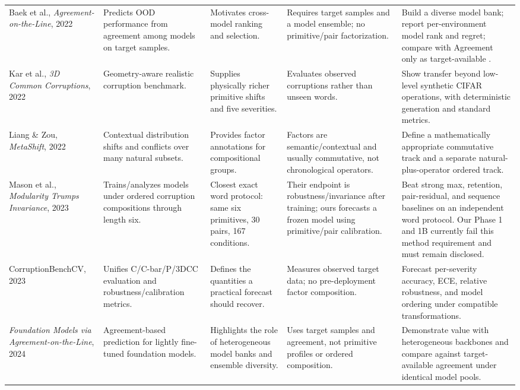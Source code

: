 \documentclass[11pt,a4paper]{article}
\newcommand{\Rthree}{\mathrm{R3}}
\begin{document}
\begin{landscape}
\begin{longtable}{P{3.1cm}P{3.4cm}P{4.4cm}P{4.4cm}P{5.0cm}}
Baek et al., \emph{Agreement-on-the-Line}, 2022 \cite{baek2022}
& Predicts OOD performance from agreement among models on target samples.
& Motivates cross-model ranking and selection.
& Requires target samples and a model ensemble; no primitive/pair factorization.
& Build a diverse model bank; report per-environment model rank and regret; compare with Agreement only as target-available \Rthree{}. \\

Kar et al., \emph{3D Common Corruptions}, 2022 \cite{kar2022}
& Geometry-aware realistic corruption benchmark.
& Supplies physically richer primitive shifts and five severities.
& Evaluates observed corruptions rather than unseen words.
& Show transfer beyond low-level synthetic CIFAR operations, with deterministic generation and standard metrics. \\

Liang \& Zou, \emph{MetaShift}, 2022 \cite{liang2022}
& Contextual distribution shifts and conflicts over many natural subsets.
& Provides factor annotations for compositional groups.
& Factors are semantic/contextual and usually commutative, not chronological operators.
& Define a mathematically appropriate commutative track and a separate natural-plus-operator ordered track. \\

Mason et al., \emph{Modularity Trumps Invariance}, 2023 \cite{mason2023}
& Trains/analyzes models under ordered corruption compositions through length six.
& Closest exact word protocol: same six primitives, 30 pairs, 167 conditions.
& Their endpoint is robustness/invariance after training; ours forecasts a frozen model using primitive/pair calibration.
& Beat strong max, retention, pair-residual, and sequence baselines on an independent word protocol. Our Phase 1 and 1B currently fail this method requirement and must remain disclosed. \\

CorruptionBenchCV, 2023 \cite{corruptionbench2023}
& Unifies C/C-bar/P/3DCC evaluation and robustness/calibration metrics.
& Defines the quantities a practical forecast should recover.
& Measures observed target data; no pre-deployment factor composition.
& Forecast per-severity accuracy, ECE, relative robustness, and model ordering under compatible transformations. \\

\emph{Foundation Models via Agreement-on-the-Line}, 2024 \cite{foundationagreement2024}
& Agreement-based prediction for lightly fine-tuned foundation models.
& Highlights the role of heterogeneous model banks and ensemble diversity.
& Uses target samples and agreement, not primitive profiles or ordered composition.
& Demonstrate value with heterogeneous backbones and compare against target-available agreement under identical model pools. \\


\end{longtable}
\end{landscape}
\end{document}
